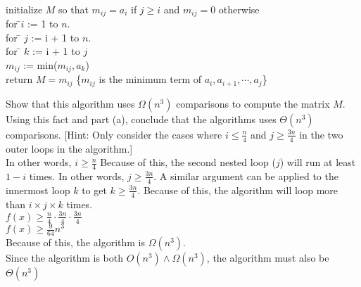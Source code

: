 \documentclass[12pt]{article}  %
\newcommand{\AND}{\wedge}
\begin{document}
\clearpage
{}\\
\begin{tabbing}
initialize $M$ so that $m_{ij}=a_i$ if $j\geq i$ and $m_{ij}=0$ otherwise\\
for \=$i$ := 1 to $n$.\\
\> for \= $j$ := i + 1 to $n$.\\
\> \>for \= $k$ := i + 1 to $j$\\
\> \> \>$m_{ij}$ := min($m_{ij},a_k$)\\
return $M={m_{ij}}$ \{$m_{ij}$ is the minimum term of $a_i,a_{i+1},\cdots,a_j$\}
\end{tabbing}
Show that this algorithm uses $\Omega(n^3)$ comparisons to compute the matrix $M$. Using this fact and part (a), conclude that the algorithms uses $\Theta(n^3)$ comparisons. [Hint: Only consider the cases where $i\leq \frac{n}{4}$ and $j\geq \frac{3n}{4}$ in the two outer loops in the algorithm.]\\

In other words, $i\geq\frac{n}{4}$ Because of this, the second nested loop ($j$) will run at least $1-i$ times.
In other words, $j\geq\frac{3n}{4}$. A similar argument can be applied to the innermost loop $k$ to get $k\geq\frac{3n}{4}$.
Because of this, the algorithm will loop more than $i\times j\times k$ times.\\
$\displaystyle f(x)\geq \frac{n}{4}\cdot\frac{3n}{4}\cdot\frac{3n}{4}$\\
$\displaystyle f(x)\geq \frac{9}{64}n^3$\\
Because of this, the algorithm is $\Omega(n^3)$.\\
Since the algorithm is both $O(n^3)\AND\Omega(n^3)$, the algorithm must also be $\Theta(n^3)$
\end{document}
